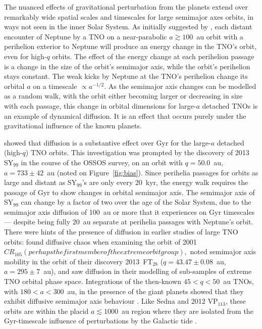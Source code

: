 \documentclass[preprint]{aastex62}
\begin{document}
The nuanced effects of gravitational perturbation from the planets extend over remarkably wide spatial scales and timescales for large semimajor axes orbits, in ways not seen in the inner Solar System.
As initially suggested by \citet{Duncan1987}, each distant encounter of Neptune by a TNO on a near-parabolic $a \gtrsim 100$~au orbit with a perihelion exterior to Neptune will produce an energy change in the TNO's orbit, even for high-$q$ orbits. 
The effect of the energy change at each perihelion passage is a change in the size of the orbit's semimajor axis, while the orbit's perihelion stays constant.
The weak kicks by Neptune at the TNO's perihelion change its orbital $a$ on a timescale $\propto a^{-1/2}$.
As the semimajor axis changes can be modelled as a random walk, with the orbit either becoming larger or decreasing in size with each passage, this change in orbital dimensions for large-$a$ detached TNOs is an example of dynamical diffusion.
It is an effect that occurs purely under the gravitational influence of the known planets.

\citet{bannister17} showed that diffusion is a substantive effect over Gyr for the large-$a$ detached (high-$q$) TNO orbits.
This investigation was prompted by the discovery of 2013 SY$_{99}$ in the course of the OSSOS survey, on an orbit with $q = 50.0$~au, $a = 733 \pm 42$~au (noted on Figure~\ref{fig:bias}).
Since perihelia passages for orbits as large and distant as SY$_{99}$'s are only every 20~kyr, the energy walk requires the passage of Gyr to show changes in orbital semimajor axis.
The semimajor axis of SY$_{99}$ can change by a factor of two over the age of the Solar System, due to the semimajor axis diffusion of 100~au or more that it experiences on Gyr timescales --- despite being fully 20~au separate at perihelia passages with Neptune's orbit.
There were hints of the presence of diffusion in earlier studies of large TNO orbits: \citet{gladman02} found diffusive chaos when examining the orbit of 2001 $CR_{105} (perhaps the first member of the extreme orbit group), $\citet{sheppardtrujillo16} noted semimajor axis mobility in the orbit of their discovery 2013~FT$_{28}$ ($q = 43.47 \pm 0.08$~au, $a = 295 \pm 7$~au), and \citet{gallardo12,brasserschwamb15} saw diffusion in their modelling of sub-samples of extreme TNO orbital phase space.
Integrations of the then-known $45<q<50$~au TNOs, with $180 < a < 300$~au, in the presence of the giant planets showed that they exhibit diffusive semimajor axis behaviour \citep{bannister17}. 
Like Sedna and 2012 VP$_{113}$, these orbits are within the placid $a \lesssim 1000$~au region where they are isolated from the Gyr-timescale influence of perturbations by the Galactic tide \citep{brasserschwamb15}.
\end{document}
